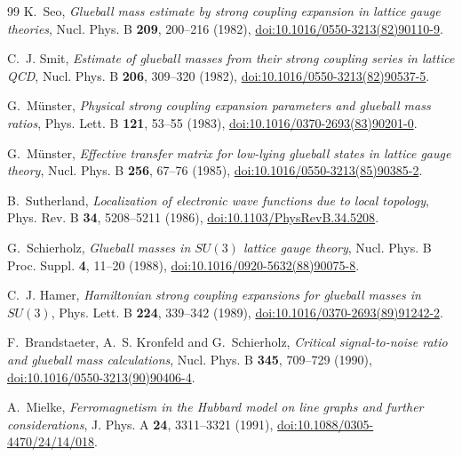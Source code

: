\documentclass[11pt]{article}
\theoremstyle{plain}
\theoremstyle{definition}
\theoremstyle{remark}
\begin{document}
\begin{thebibliography}{99}
 K.~Seo,
  \emph{Glueball mass estimate by strong coupling expansion in lattice gauge
  theories}, Nucl. Phys. B \textbf{209}, 200--216 (1982),
  \href{https://doi.org/10.1016/0550-3213(82)90110-9}{doi:10.1016/0550-3213(82)90110-9}.

 C.~J. Smit,
  \emph{Estimate of glueball masses from their strong coupling series in
  lattice QCD}, Nucl. Phys. B \textbf{206}, 309--320 (1982),
  \href{https://doi.org/10.1016/0550-3213(82)90537-5}{doi:10.1016/0550-3213(82)90537-5}.

 G.~M\"unster,
  \emph{Physical strong coupling expansion parameters and glueball mass
  ratios}, Phys. Lett. B \textbf{121}, 53--55 (1983),
  \href{https://doi.org/10.1016/0370-2693(83)90201-0}{doi:10.1016/0370-2693(83)90201-0}.

 G.~M\"unster,
  \emph{Effective transfer matrix for low-lying glueball states in lattice
  gauge theory}, Nucl. Phys. B \textbf{256}, 67--76 (1985),
  \href{https://doi.org/10.1016/0550-3213(85)90385-2}{doi:10.1016/0550-3213(85)90385-2}.

 B.~Sutherland,
  \emph{Localization of electronic wave functions due to local topology},
  Phys. Rev. B \textbf{34}, 5208--5211 (1986),
  \href{https://doi.org/10.1103/PhysRevB.34.5208}{doi:10.1103/PhysRevB.34.5208}.

 G.~Schierholz,
  \emph{Glueball masses in $SU(3)$ lattice gauge theory},
  Nucl. Phys. B Proc. Suppl. \textbf{4}, 11--20 (1988),
  \href{https://doi.org/10.1016/0920-5632(88)90075-8}{doi:10.1016/0920-5632(88)90075-8}.

 C.~J. Hamer,
  \emph{Hamiltonian strong coupling expansions for glueball masses in
  $SU(3)$}, Phys. Lett. B \textbf{224}, 339--342 (1989),
  \href{https://doi.org/10.1016/0370-2693(89)91242-2}{doi:10.1016/0370-2693(89)91242-2}.

 F.~Brandstaeter, A.~S. Kronfeld and G.~Schierholz,
  \emph{Critical signal-to-noise ratio and glueball mass calculations},
  Nucl. Phys. B \textbf{345}, 709--729 (1990),
  \href{https://doi.org/10.1016/0550-3213(90)90406-4}{doi:10.1016/0550-3213(90)90406-4}.

 A.~Mielke,
  \emph{Ferromagnetism in the Hubbard model on line graphs and further
  considerations}, J. Phys. A \textbf{24}, 3311--3321 (1991),
  \href{https://doi.org/10.1088/0305-4470/24/14/018}{doi:10.1088/0305-4470/24/14/018}.


\end{thebibliography}
\end{document}
